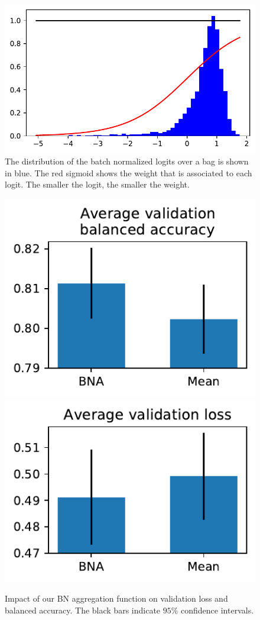 \documentclass[final]{cvpr}
\begin{document}
\begin{figure}[t]
	\begin{center}
		\includegraphics[width=0.95\linewidth]{fig/aggreg_2.pdf}
	\end{center}
	\caption{The distribution of the batch normalized logits over a bag is shown in blue. The red sigmoid shows the weight that is associated to each logit. The smaller the logit, the smaller the weight.}
	\label{fig:aggreg}
\end{figure}

\begin{figure}[t]
	\begin{center}
		\includegraphics[width=0.47\linewidth]{fig/agg_bal_acc.pdf}
		\includegraphics[width=0.47\linewidth]{fig/agg_val_loss.pdf}
	\end{center}
	\caption{Impact of our BN aggregation function on validation loss and balanced accuracy.  The black bars indicate $95\%$ confidence intervals.}
	\label{fig:resnet}
\end{figure}
\end{document}

